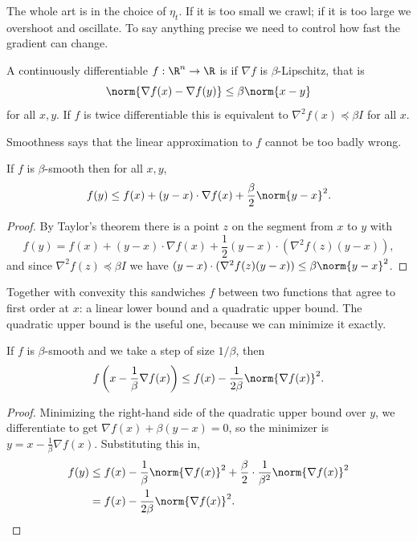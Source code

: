 \documentclass[a4paper]{scrartcl}
\begin{document}
The whole art is in the choice of $\eta_t$. If it is too small we crawl; if it is too large we overshoot and oscillate. To say anything precise we need to control how fast the gradient can change.

\begin{definition}[Smoothness]
    A continuously differentiable $f : \R^n \rightarrow \R$ is  if $\nabla f$ is $\beta$-Lipschitz, that is
    $$
    \norm{\nabla f(x) - \nabla f(y)} \leq \beta \norm{x - y}
    $$
    for all $x, y$. If $f$ is twice differentiable this is equivalent to $\nabla^2 f(x) \preceq \beta I$ for all $x$.
\end{definition}

Smoothness says that the linear approximation to $f$ cannot be too badly wrong.

\begin{lemma}
    If $f$ is $\beta$-smooth then for all $x, y$,
    $$
    f(y) \leq f(x) + (y - x) \cdot \nabla f(x) + \frac{\beta}{2} \norm{y - x}^2.
    $$
\end{lemma}
\begin{proof}
    By Taylor's theorem there is a point $z$ on the segment from $x$ to $y$ with
    $$
    f(y) = f(x) + (y-x)\cdot \nabla f(x) + \frac{1}{2}(y - x)\cdot (\nabla^2 f(z)(y-x)),
    $$
    and since $\nabla^2 f(z) \preceq \beta I$ we have $(y-x)\cdot (\nabla^2 f(z)(y-x)) \leq \beta \norm{y-x}^2$.
\end{proof}

Together with convexity this sandwiches $f$ between two functions that agree to first order at $x$: a linear lower bound and a quadratic upper bound. The quadratic upper bound is the useful one, because we can minimize it exactly.

\begin{corollary}
    If $f$ is $\beta$-smooth and we take a step of size $1/\beta$, then
    $$
    f\left(x - \frac{1}{\beta}\nabla f(x)\right) \leq f(x) - \frac{1}{2\beta}\norm{\nabla f(x)}^2.
    $$
\end{corollary}
\begin{proof}
    Minimizing the right-hand side of the quadratic upper bound over $y$, we differentiate to get $\nabla f(x) + \beta(y - x) = 0$, so the minimizer is $y = x - \frac{1}{\beta}\nabla f(x)$. Substituting this in,
    \begin{align*}
        f(y) &\leq f(x) - \frac{1}{\beta}\norm{\nabla f(x)}^2 + \frac{\beta}{2}\cdot \frac{1}{\beta^2}\norm{\nabla f(x)}^2 \\
        &= f(x) - \frac{1}{2\beta}\norm{\nabla f(x)}^2. \qedhere
    \end{align*}
\end{proof}
\end{document}
